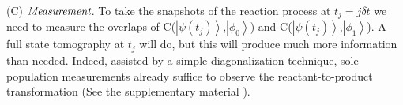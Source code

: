 \documentclass[prl,twocolumn,showpacs]{revtex4}
\begin{document}
(C) $\emph{Measurement}$. To take the snapshots of the reaction process at $t_j=j\delta t$ we need to measure the overlaps of C($\left\vert \psi(t_j) \right\rangle$,$\left\vert \phi_{0} \right\rangle$) and C($\left\vert \psi({t_j}) \right\rangle$,$\left\vert \phi_{1} \right\rangle$). A full state tomography at $t_j$ will do, but this will produce much more information than needed. Indeed, assisted by a simple diagonalization technique, sole population measurements already suffice to observe the reactant-to-product transformation (See the supplementary material \cite{supplement}).


\end{document}
